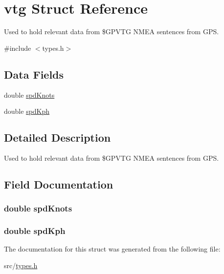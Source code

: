 \hypertarget{structvtg}{}\section{vtg Struct Reference}
\label{structvtg}


Used to hold relevant data from \$\+G\+P\+V\+TG N\+M\+EA sentences from G\+PS.  




{\ttfamily \#include $<$types.\+h$>$}

\subsection*{Data Fields}
\begin{DoxyCompactItemize}
\item 
double \hyperlink{structvtg_aafd79f80d0c8c393f4ddad96148f6175}{spd\+Knots}
\item 
double \hyperlink{structvtg_acdf277ddb345fbdb7ef861a9c37c290e}{spd\+Kph}
\end{DoxyCompactItemize}


\subsection{Detailed Description}
Used to hold relevant data from \$\+G\+P\+V\+TG N\+M\+EA sentences from G\+PS. 

\subsection{Field Documentation}
\subsubsection[{\texorpdfstring{spd\+Knots}{spdKnots}}]{\setlength{\rightskip}{0pt plus 5cm}double spd\+Knots}\hypertarget{structvtg_aafd79f80d0c8c393f4ddad96148f6175}{}\label{structvtg_aafd79f80d0c8c393f4ddad96148f6175}
\subsubsection[{\texorpdfstring{spd\+Kph}{spdKph}}]{\setlength{\rightskip}{0pt plus 5cm}double spd\+Kph}\hypertarget{structvtg_acdf277ddb345fbdb7ef861a9c37c290e}{}\label{structvtg_acdf277ddb345fbdb7ef861a9c37c290e}


The documentation for this struct was generated from the following file\+:\begin{DoxyCompactItemize}
\item 
src/\hyperlink{types_8h}{types.\+h}\end{DoxyCompactItemize}
